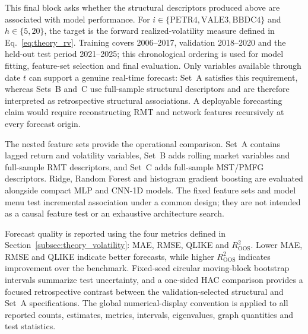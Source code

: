 This final block asks whether the structural descriptors produced above are associated with model performance. For $i\in\{\mathrm{PETR4},\mathrm{VALE3},\mathrm{BBDC4}\}$ and $h\in\{5,20\}$, the target is the forward realized-volatility measure defined in Eq.~\eqref{eq:theory_rv}. Training covers 2006--2017, validation 2018--2020 and the held-out test period 2021--2025; this chronological ordering is used for model fitting, feature-set selection and final evaluation. Only variables available through date $t$ can support a genuine real-time forecast: Set~A satisfies this requirement, whereas Sets~B and~C use full-sample structural descriptors and are therefore interpreted as retrospective structural associations. A deployable forecasting claim would require reconstructing RMT and network features recursively at every forecast origin.

The nested feature sets provide the operational comparison. Set~A contains lagged return and volatility variables, Set~B adds rolling market variables and full-sample RMT descriptors, and Set~C adds full-sample MST/PMFG descriptors. Ridge, Random Forest and histogram gradient boosting are evaluated alongside compact MLP and CNN-1D models. The fixed feature sets and model menu test incremental association under a common design; they are not intended as a causal feature test or an exhaustive architecture search.

Forecast quality is reported using the four metrics defined in Section~\ref{subsec:theory_volatility}: MAE, RMSE, QLIKE and $R^2_{\mathrm{OOS}}$. Lower MAE, RMSE and QLIKE indicate better forecasts, while higher $R^2_{\mathrm{OOS}}$ indicates improvement over the benchmark. Fixed-seed circular moving-block bootstrap intervals summarize test uncertainty, and a one-sided HAC comparison provides a focused retrospective contrast between the validation-selected structural and Set~A specifications. The global numerical-display convention is applied to all reported counts, estimates, metrics, intervals, eigenvalues, graph quantities and test statistics.
